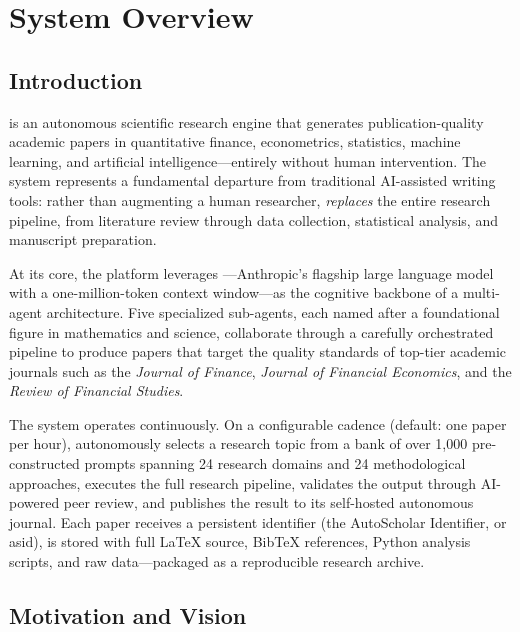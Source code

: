 \chapter{System Overview}
\label{ch:overview}

\section{Introduction}
\label{sec:overview:intro}

\autoscholar is an autonomous scientific research engine that generates publication-quality academic papers in quantitative finance, econometrics, statistics, machine learning, and artificial intelligence---entirely without human intervention.
The system represents a fundamental departure from traditional AI-assisted writing tools: rather than augmenting a human researcher, \autoscholar \emph{replaces} the entire research pipeline, from literature review through data collection, statistical analysis, and manuscript preparation.

At its core, the platform leverages \claude---Anthropic's flagship large language model with a one-million-token context window---as the cognitive backbone of a multi-agent architecture.
Five specialized sub-agents, each named after a foundational figure in mathematics and science, collaborate through a carefully orchestrated pipeline to produce papers that target the quality standards of top-tier academic journals such as the \emph{Journal of Finance}, \emph{Journal of Financial Economics}, and the \emph{Review of Financial Studies}.

The system operates continuously.
On a configurable cadence (default: one paper per hour), \autoscholar autonomously selects a research topic from a bank of over 1,000 pre-constructed prompts spanning 24 research domains and 24 methodological approaches, executes the full research pipeline, validates the output through AI-powered peer review, and publishes the result to its self-hosted autonomous journal.
Each paper receives a persistent identifier (the AutoScholar Identifier, or \gls{asid}), is stored with full \LaTeX{} source, BibTeX references, Python analysis scripts, and raw data---packaged as a reproducible research archive.

\section{Motivation and Vision}
\label{sec:overview:motivation}

